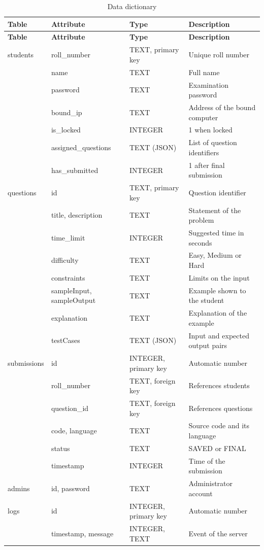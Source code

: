 \documentclass[12pt,a4paper]{report}
\begin{document}
{\footnotesize\begin{longtable}{@{}L{2.4cm} L{3.2cm} L{2.5cm} L{3.7cm}@{}}
\caption{Data dictionary}\label{tab:dict}\\
\toprule
\textbf{Table} & \textbf{Attribute} & \textbf{Type} & \textbf{Description}\\
\midrule
\endfirsthead
\toprule
\textbf{Table} & \textbf{Attribute} & \textbf{Type} & \textbf{Description}\\
\midrule
\endhead
students & roll\_number & TEXT, primary key & Unique roll number\\
 & name & TEXT & Full name\\
 & password & TEXT & Examination password\\
 & bound\_ip & TEXT & Address of the bound computer\\
 & is\_locked & INTEGER & 1 when locked\\
 & assigned\_questions & TEXT (JSON) & List of question identifiers\\
 & has\_submitted & INTEGER & 1 after final submission\\
\midrule
questions & id & TEXT, primary key & Question identifier\\
 & title, description & TEXT & Statement of the problem\\
 & time\_limit & INTEGER & Suggested time in seconds\\
 & difficulty & TEXT & Easy, Medium or Hard\\
 & constraints & TEXT & Limits on the input\\
 & sampleInput, sampleOutput & TEXT & Example shown to the student\\
 & explanation & TEXT & Explanation of the example\\
 & testCases & TEXT (JSON) & Input and expected output pairs\\
\midrule
submissions & id & INTEGER, primary key & Automatic number\\
 & roll\_number & TEXT, foreign key & References students\\
 & question\_id & TEXT, foreign key & References questions\\
 & code, language & TEXT & Source code and its language\\
 & status & TEXT & SAVED or FINAL\\
 & timestamp & INTEGER & Time of the submission\\
\midrule
admins & id, password & TEXT & Administrator account\\
\midrule
logs & id & INTEGER, primary key & Automatic number\\
 & timestamp, message & INTEGER, TEXT & Event of the server\\
\bottomrule
\end{longtable}}
\end{document}
